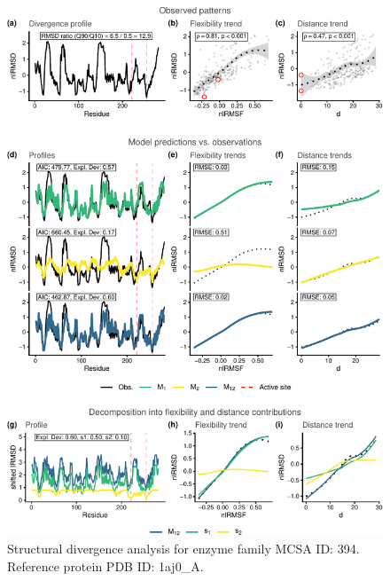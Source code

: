 \documentclass[
]{article}
\begin{document}
\clearpage
\begin{figure}[H]
\centering


\begin{center}\includegraphics{supplementary_material_files/figure-latex/generate_figures-20} \end{center}

\caption{Structural divergence analysis for enzyme family MCSA ID: 394. Reference protein PDB ID: 1aj0\_A.}
\end{figure}
\end{document}
